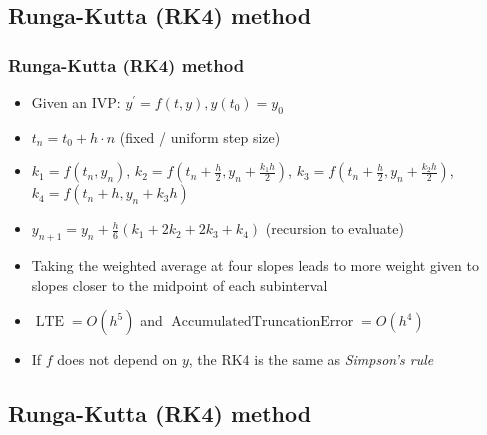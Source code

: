 \documentclass[usenames,svgnames,dvipsnames,10pt]{beamer}
\begin{document}
\subsection{Runga-Kutta (RK4) method}

\begin{frame}
\frametitle{Runga-Kutta (RK4) method}

\begin{itemize} 

\item Given an IVP: $y^{\prime} = f(t, y), y(t_0) = y_0$ 
\item $t_n = t_0 +h \cdot n$ (fixed / uniform step size)
\item $k_1 = f(t_n, y_n)$, $k_2 = f\left(t_n + \frac{h}{2}, y_n + \frac{k_1h}{2}\right)$, 
      $k_3 = f\left(t_n + \frac{h}{2}, y_n + \frac{k_2h}{2}\right)$, $k_4 = f\left(t_n + h, y_n + k_3h\right) $ 
\item $y_{n+1} = y_n + \frac{h}{6}\left(k_1 + 2k_2 + 2k_3 + k_4\right)$ (recursion to evaluate) 
\item Taking the weighted average at four slopes leads to more weight given to slopes closer to the midpoint 
      of each subinterval 
\item $\operatorname{LTE} = O(h^5)$ and $\operatorname{AccumulatedTruncationError} = O(h^4)$ 
\item If $f$ does not depend on $y$, the RK4 is the same as \emph{Simpson's rule} 

\end{itemize} 

\end{frame}

\subsection{Runga-Kutta (RK4) method}
\end{document}
